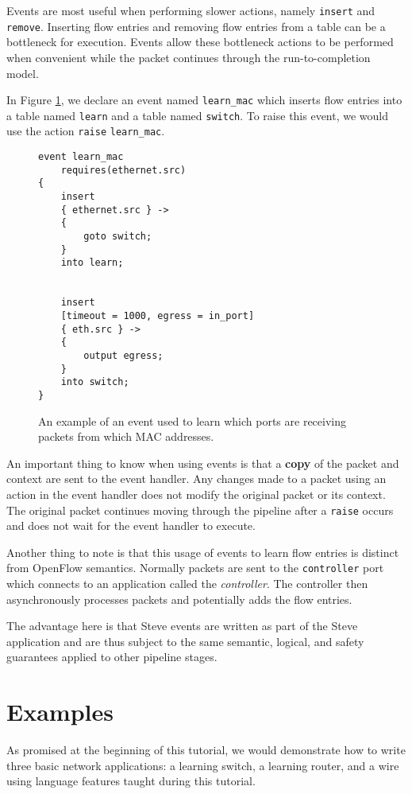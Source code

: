 Events are most useful when performing slower actions, namely \texttt{insert} and \texttt{remove}. Inserting flow entries and removing flow entries from a table can be a bottleneck for execution. Events allow these bottleneck actions to be performed when convenient while the packet continues through the run-to-completion model.

In Figure \ref{fg:event_ex}, we declare an event named \texttt{learn\_mac} which inserts flow entries into a table named \texttt{learn} and a table named \texttt{switch}. To raise this event, we would use the action \texttt{\color{blue}raise} \texttt{learn\_mac}. 

\begin{figure}[ht]
\begin{lstlisting}
event learn_mac
	requires(ethernet.src)
{
	insert
	{ ethernet.src } ->
	{
		goto switch;
	}
	into learn;


	insert
	[timeout = 1000, egress = in_port]
	{ eth.src } ->
	{
		output egress;
	}
	into switch;
}
\end{lstlisting}
\caption{An example of an event used to learn which ports are receiving packets from which MAC addresses.}
\label{fg:event_ex}
\end{figure}

An important thing to know when using events is that a \textbf{copy} of the packet and context are sent to the event handler. Any changes made to a packet using an action in the event handler does not modify the original packet or its context. The original packet continues moving through the pipeline after a \texttt{raise} occurs and does not wait for the event handler to execute.

Another thing to note is that this usage of events to learn flow entries is distinct from OpenFlow semantics. Normally packets are sent to the \texttt{controller} port which connects to an application called the \textit{controller}. The controller then asynchronously processes packets and potentially adds the flow entries.

The advantage here is that Steve events are written as part of the Steve application and are thus subject to the same semantic, logical, and safety guarantees applied to other pipeline stages. 

\section{Examples} \label{tut:examples}

As promised at the beginning of this tutorial, we would demonstrate how to write three basic network applications: a learning switch, a learning router, and a wire using language features taught during this tutorial.

